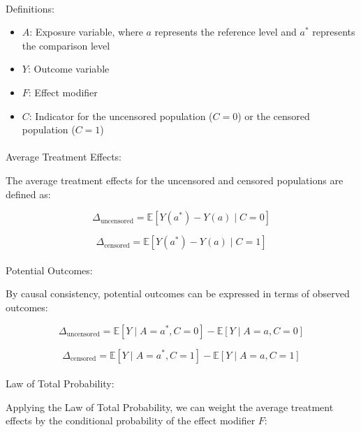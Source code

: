 \documentclass[
  single column]{article}
\makeatletter
\let\oldparagraph\paragraph
\renewcommand{\paragraph}{
    \@ifstar
      \xxxParagraphStar
      \xxxParagraphNoStar
  }
\newcommand{\xxxParagraphStar}[1]{\oldparagraph*{#1}\mbox{}}
\newcommand{\xxxParagraphNoStar}[1]{\oldparagraph{#1}\mbox{}}
\providecommand{\tightlist}{%
  \setlength{\itemsep}{0pt}\setlength{\parskip}{0pt}}\usepackage{longtable,booktabs,array}
\makeatother
\begin{document}
\paragraph{Definitions:}\label{definitions}

\begin{itemize}
\tightlist
\item
  \textbf{\(A\)}: Exposure variable, where \(a\) represents the
  reference level and \(a^*\) represents the comparison level
\item
  \textbf{\(Y\)}: Outcome variable
\item
  \textbf{\(F\)}: Effect modifier
\item
  \textbf{\(C\)}: Indicator for the uncensored population (\(C = 0\)) or
  the censored population (\(C = 1\))
\end{itemize}

\paragraph{Average Treatment Effects:}\label{average-treatment-effects}

The average treatment effects for the uncensored and censored
populations are defined as:

\[ \Delta_{\text{uncensored}} = \mathbb{E}[Y(a^*) - Y(a) \mid C = 0] \]

\[ \Delta_{\text{censored}} = \mathbb{E}[Y(a^*) - Y(a) \mid C = 1] \]

\paragraph{Potential Outcomes:}\label{potential-outcomes}

By causal consistency, potential outcomes can be expressed in terms of
observed outcomes:

\[ \Delta_{\text{uncensored}} = \mathbb{E}[Y \mid A=a^*, C=0] - \mathbb{E}[Y \mid A=a, C=0] \]

\[ \Delta_{\text{censored}} = \mathbb{E}[Y \mid A=a^*, C=1] - \mathbb{E}[Y \mid A=a, C=1] \]

\paragraph{Law of Total Probability:}\label{law-of-total-probability}

Applying the Law of Total Probability, we can weight the average
treatment effects by the conditional probability of the effect modifier
\(F\):
\end{document}
